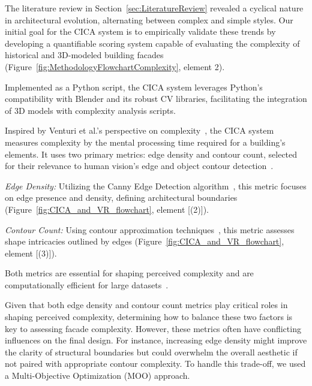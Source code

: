 
The literature review in Section~\ref{sec:LiteratureReview} revealed a cyclical nature in architectural evolution, alternating between complex and simple styles.
Our initial goal for the CICA system is to empirically validate these trends by developing a quantifiable scoring system capable of evaluating the complexity of historical and 3D-modeled building facades (Figure~\ref{fig:MethodologyFlowchartComplexity}, element 2).

Implemented as a Python script, the CICA system leverages Python's compatibility with Blender and its robust CV libraries, facilitating the integration of 3D models with complexity analysis scripts.

Inspired by Venturi et al.'s perspective on complexity~\cite{Venturi1977}, the CICA system measures complexity by the mental processing time required for a building's elements.
It uses two primary metrics: edge density and contour count, selected for their relevance to human vision's edge and object contour detection~\cite{Yang2022}.

\textit{Edge Density:} Utilizing the Canny Edge Detection algorithm~\cite{EdgeOpenCV2023}, this metric focuses on edge presence and density, defining architectural boundaries (Figure~\ref{fig:CICA_and_VR_flowchart}, element [(2)]).

\textit{Contour Count:} Using contour approximation techniques~\cite{ContourOpenCV2023}, this metric assesses shape intricacies outlined by edges (Figure~\ref{fig:CICA_and_VR_flowchart}, element [(3)]).

Both metrics are essential for shaping perceived complexity and are computationally efficient for large datasets~\cite{Yang2022}.

Given that both edge density and contour count metrics play critical roles in shaping perceived complexity, determining how to balance these two factors is key to assessing facade complexity.
However, these metrics often have conflicting influences on the final design.
For instance, increasing edge density might improve the clarity of structural boundaries but could overwhelm the overall aesthetic if not paired with appropriate contour complexity.
To handle this trade-off, we used a Multi-Objective Optimization (MOO) approach.


